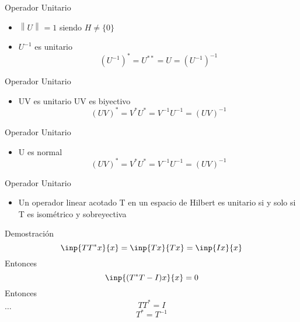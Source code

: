 \documentclass{beamer}
\newcommand{\norma}[2][]{\ensuremath{\left\lVert #2 \right\rVert_{#1}}}
\begin{document}
\begin{frame}{Operador Unitario}
  \begin{itemize}
    \item $\norma{U}{}=1$ siendo $H\neq \{0\}$
    \item $U^{-1}$ es unitario
      $$(U^{-1})^* = U^{**} = U = (U^{-1})^{-1}$$
  \end{itemize}
\end{frame}

\begin{frame}{Operador Unitario}
  \begin{itemize}
    \item UV es unitario
      UV es biyectivo
      $$(UV)^* = V^*U^* = V^{-1}U^{-1}=(UV)^{-1}$$
  \end{itemize}
\end{frame}

\begin{frame}{Operador Unitario}
  \begin{itemize}
    \item U es normal
      $$(UV)^* = V^*U^* = V^{-1}U^{-1}=(UV)^{-1}$$
  \end{itemize}
\end{frame}

\begin{frame}{Operador Unitario}
  \begin{itemize}
    \item Un operador linear acotado T en un espacio de Hilbert es
      unitario si y solo si T es isométrico y sobreyectiva
  \end{itemize}
\end{frame}
\begin{frame}{Demostración}
  $$\inp{TT^*x}{x} = \inp{Tx}{Tx} = \inp{Ix}{x} $$
  Entonces 
  $$\inp{(T^*T-I)x}{x} =0$$
  Entonces
  $$TT^* = I$$
  $\dots$
  $$T^*=T^{-1}$$
\end{frame}
\end{document}

